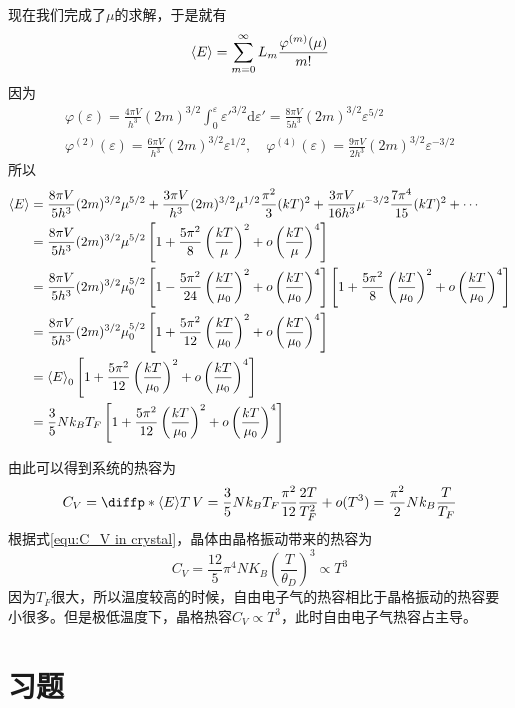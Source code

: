 现在我们完成了$\mu$的求解，于是就有\begin{equation} 
    \braket{E} =\sum_{m=0}^{\infty}L_m \frac{\varphi^{(m)}(\mu)}{m!}
\end{equation}
因为\begin{equation}
    \begin{gathered}
        \varphi(\varepsilon)=\frac{4\pi V}{h^3} (2m)^{3/2}\int_0^\varepsilon {\varepsilon'}^{3/2} \mathrm{d}\varepsilon'= \frac{8\pi V}{5h^3} (2m)^{3/2} \varepsilon^{5/2}\\
        \varphi^{(2)}(\varepsilon)= \frac{6\pi V}{h^3} (2m)^{3/2} \varepsilon^{1/2},\quad
        \varphi^{(4)}(\varepsilon)= \frac{9\pi V}{2h^3} (2m)^{3/2} \varepsilon^{-3/2}
    \end{gathered}
\end{equation}
所以\begin{equation}
    \begin{aligned}
        \braket{E} &=\frac{8\pi V}{5h^3}(2m)^{3/2}  \mu^{5/2} +\frac{3\pi V}{h^3}(2m)^{3/2} \mu^{1/2} \frac{\pi^2}{3}(kT)^2+\frac{3\pi V}{16h^3} \mu^{-3/2} \frac{7\pi^4}{15}(kT)^2+\cdots\\
        &= \frac{8\pi V}{5h^3}(2m)^{3/2}  \mu^{5/2}\left[1+\frac
        {5\pi^2}{8} \left(\frac{kT}{\mu}\right)^2+o\left(\frac{kT}{\mu}\right)^4\right]\\
        &= \frac{8\pi V}{5h^3}(2m)^{3/2}  \mu_0^{5/2}\left[1-\frac
        {5\pi^2}{24} \left(\frac{kT}{\mu_0}\right)^2+o\left(\frac{kT}{\mu_0}\right)^4\right] \left[1+\frac{5\pi^2}{8}\left(\frac{kT}{\mu_0}\right)^2+o\left(\frac{kT}{\mu_0}\right)^4\right]\\
        & = \frac{8\pi V}{5h^3}(2m)^{3/2}  \mu_0^{5/2}\left[1+\frac
        {5\pi^2}{12} \left(\frac{kT}{\mu_0}\right)^2+o\left(\frac{kT}{\mu_0}\right)^4\right]\\
        & = \braket{E}_0 \left[1+\frac
        {5\pi^2}{12} \left(\frac{kT}{\mu_0}\right)^2+o\left(\frac{kT}{\mu_0}\right)^4\right]\\
        & =\frac{3}{5} Nk_B T_F \left[1+\frac
        {5\pi^2}{12} \left(\frac{kT}{\mu_0}\right)^2+o\left(\frac{kT}{\mu_0}\right)^4\right]
    \end{aligned}
\end{equation}

由此可以得到系统的热容为\begin{equation}
    C_V= \diffp*{{\braket{E}}}{T}{\, V} = \frac{3}{5} Nk_B T_F \frac{\pi^2}{12} \frac{2T}{T_F^2} +o(T^3) =\frac{\pi^2}{2} Nk_B \frac{T}{T_F}
\end{equation}
根据式\eqref{equ:C_V in crystal}，晶体由晶格振动带来的热容为\begin{equation}
    C_V =\frac{12}{5}\pi^4 N K_B \left(\frac{T}{\theta_D}\right)^3 \propto T^3
\end{equation}
因为$T_F$很大，所以温度较高的时候，自由电子气的热容相比于晶格振动的热容要小很多。但是极低温度下，晶格热容$C_V \propto T^3$，此时自由电子气热容占主导。

\section{习题} %
\label{sec:习题8}

